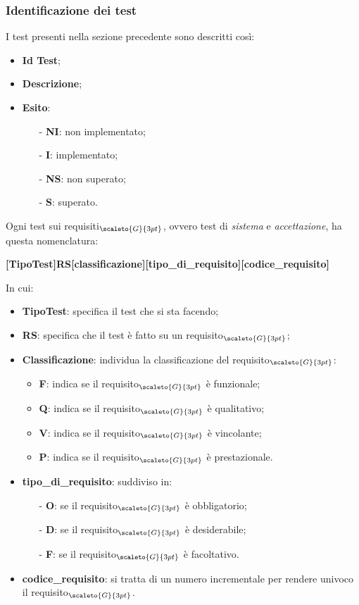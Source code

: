 \subsubsection{Identificazione dei test}\label{ProcessiDiSupportoVerificaAttivitàIdentificazioneDeiTest}
I test presenti nella sezione precedente sono descritti così:
\begin{itemize}
	\item \textbf{Id Test};
	\item \textbf{Descrizione};
	\item \textbf{Esito}:
	\begin{itemize}
		\item[-] \textbf{NI}: non implementato;
		\item[-] \textbf{I}: implementato;
		\item[-] \textbf{NS}: non superato;
		\item[-] \textbf{S}: superato.
	\end{itemize}
\end{itemize}

Ogni test sui requisiti$_{\scaleto{G}{3pt}}$, ovvero test di \textit{sistema} e \textit{accettazione}, ha questa nomenclatura:
\begin{center}
	\textbf{[TipoTest]RS[classificazione][tipo\_di\_requisito][codice\_requisito]}
\end{center}
In cui:
\begin{itemize}
	\item \textbf{TipoTest}: specifica il test che si sta facendo;
	\item \textbf{RS}: specifica che il test è fatto su un requisito$_{\scaleto{G}{3pt}}$;
	\item \textbf{Classificazione}: individua la classificazione del requisito$_{\scaleto{G}{3pt}}$:
	\begin{itemize}
		\item \textbf{F}: indica se il requisito$_{\scaleto{G}{3pt}}$ è funzionale;
		\item \textbf{Q}: indica se il requisito$_{\scaleto{G}{3pt}}$ è qualitativo;
		\item \textbf{V}: indica se il requisito$_{\scaleto{G}{3pt}}$ è vincolante;
		\item \textbf{P}: indica se il requisito$_{\scaleto{G}{3pt}}$ è prestazionale.
	\end{itemize}
	\item \textbf{tipo\_di\_requisito}: suddiviso in:
	\begin{itemize}
		\item[-] \textbf{O}: se il requisito$_{\scaleto{G}{3pt}}$ è obbligatorio;
		\item[-] \textbf{D}: se il requisito$_{\scaleto{G}{3pt}}$ è desiderabile;
		\item[-] \textbf{F}: se il requisito$_{\scaleto{G}{3pt}}$ è facoltativo.
	\end{itemize}
	\item \textbf{codice\_requisito}: si tratta di un numero incrementale per rendere univoco il requisito$_{\scaleto{G}{3pt}}$.
\end{itemize}

